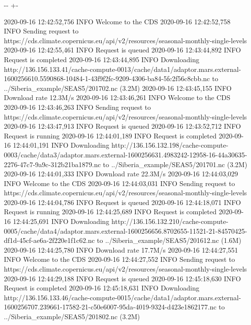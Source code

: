 \documentclass[letterpaper,10pt,english]{sphinxmanual}
\newlength\nbsphinxcodecellspacing
\begin{document}
{

\kern-\sphinxverbatimsmallskipamount\kern-\baselineskip
\kern+\FrameHeightAdjust\kern-\fboxrule
\vspace{\nbsphinxcodecellspacing}

\begin{sphinxVerbatim}[commandchars=\\\{\}]
2020-09-16 12:42:52,756 INFO Welcome to the CDS
2020-09-16 12:42:52,758 INFO Sending request to https://cds.climate.copernicus.eu/api/v2/resources/seasonal-monthly-single-levels
2020-09-16 12:42:55,461 INFO Request is queued
2020-09-16 12:43:44,892 INFO Request is completed
2020-09-16 12:43:44,895 INFO Downloading http://136.156.133.41/cache-compute-0013/cache/data1/adaptor.mars.external-1600256610.5590868-10484-1-43f9f2fc-9209-4306-ba84-5fc2f56c8cbb.nc to ../Siberia\_example/SEAS5/201702.nc (3.2M)
2020-09-16 12:43:45,155 INFO Download rate 12.3M/s
2020-09-16 12:43:46,261 INFO Welcome to the CDS
2020-09-16 12:43:46,263 INFO Sending request to https://cds.climate.copernicus.eu/api/v2/resources/seasonal-monthly-single-levels
2020-09-16 12:43:47,913 INFO Request is queued
2020-09-16 12:43:52,712 INFO Request is running
2020-09-16 12:44:01,189 INFO Request is completed
2020-09-16 12:44:01,191 INFO Downloading http://136.156.132.198/cache-compute-0003/cache/data3/adaptor.mars.external-1600256631.4983242-12958-16-44a30635-2276-47c7-9a9c-312b21ba1879.nc to ../Siberia\_example/SEAS5/201701.nc (3.2M)
2020-09-16 12:44:01,333 INFO Download rate 22.3M/s
2020-09-16 12:44:03,029 INFO Welcome to the CDS
2020-09-16 12:44:03,031 INFO Sending request to https://cds.climate.copernicus.eu/api/v2/resources/seasonal-monthly-single-levels
2020-09-16 12:44:04,786 INFO Request is queued
2020-09-16 12:44:18,071 INFO Request is running
2020-09-16 12:44:25,689 INFO Request is completed
2020-09-16 12:44:25,691 INFO Downloading http://136.156.132.210/cache-compute-0005/cache/data4/adaptor.mars.external-1600256656.8702655-11521-21-84570425-df1d-45cf-ae6a-2f220e1f1c62.nc to ../Siberia\_example/SEAS5/201612.nc (1.6M)
2020-09-16 12:44:25,780 INFO Download rate 17.7M/s
2020-09-16 12:44:27,551 INFO Welcome to the CDS
2020-09-16 12:44:27,552 INFO Sending request to https://cds.climate.copernicus.eu/api/v2/resources/seasonal-monthly-single-levels
2020-09-16 12:44:29,188 INFO Request is queued
2020-09-16 12:45:18,630 INFO Request is completed
2020-09-16 12:45:18,631 INFO Downloading http://136.156.133.46/cache-compute-0015/cache/data1/adaptor.mars.external-1600256707.239661-17582-21-c50e6007-95da-4019-9324-d423e1862177.nc to ../Siberia\_example/SEAS5/201802.nc (3.2M)

\end{sphinxVerbatim}}
\end{document}
